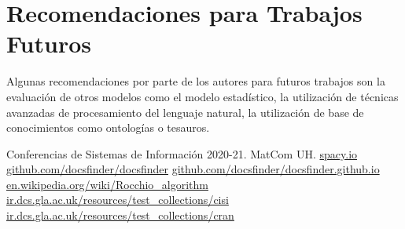 \documentclass[runningheads,a4paper]{llncs}
\begin{document}
\section{Recomendaciones para Trabajos Futuros}

Algunas recomendaciones por parte de los autores para futuros trabajos son la evaluación de otros modelos como el modelo estadístico, la utilización de técnicas avanzadas de procesamiento del lenguaje natural, la utilización de base de conocimientos como ontologías o tesauros.

\newpage

\begin{thebibliography}{0}
     Conferencias de Sistemas de Información 2020-21. MatCom UH.
      \url{spacy.io}
     \url{github.com/docsfinder/docsfinder}
     \url{github.com/docsfinder/docsfinder.github.io}
     \url{en.wikipedia.org/wiki/Rocchio_algorithm}
     \url{ir.dcs.gla.ac.uk/resources/test_collections/cisi}
     \url{ir.dcs.gla.ac.uk/resources/test_collections/cran}
\end{thebibliography}
\end{document}
